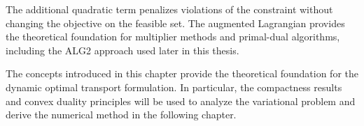 The additional quadratic term penalizes
violations of the constraint without
changing the objective on the feasible set.
The augmented Lagrangian provides the
theoretical foundation for multiplier
methods and primal-dual algorithms,
including the ALG2 approach used later
in this thesis.

The concepts introduced in this chapter provide the theoretical foundation for the dynamic optimal transport formulation. In particular, the compactness results and convex duality principles will be used to analyze the variational problem and derive the numerical method in the following chapter.

